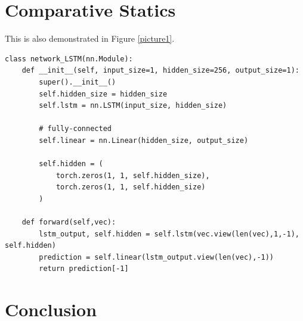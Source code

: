 \section{Comparative Statics}
This is also demonstrated in Figure \ref{picture1}.

\begin{lstlisting}[style=python_code, caption={Long short-term memory}, label=mypythoncode]
class network_LSTM(nn.Module):
    def __init__(self, input_size=1, hidden_size=256, output_size=1):
        super().__init__()
        self.hidden_size = hidden_size
        self.lstm = nn.LSTM(input_size, hidden_size)
        
        # fully-connected
        self.linear = nn.Linear(hidden_size, output_size)

        self.hidden = (
            torch.zeros(1, 1, self.hidden_size), 
            torch.zeros(1, 1, self.hidden_size)
        )

    def forward(self,vec):
        lstm_output, self.hidden = self.lstm(vec.view(len(vec),1,-1), self.hidden)
        prediction = self.linear(lstm_output.view(len(vec),-1))
        return prediction[-1]
\end{lstlisting}
  
  \section{Conclusion}
  \lipsum[7]